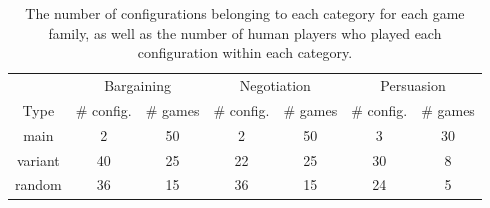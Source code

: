 \begin{table}[h]
    \centering
        \caption{The number of configurations belonging to each category for each game family, as well as the number of human players who played each configuration within each category.}

    \begin{tabular}{c|cc|cc|cc}
    \toprule
     & \multicolumn{2}{|c}{Bargaining} & \multicolumn{2}{|c}{Negotiation} & \multicolumn{2}{|c}{Persuasion} \\
     Type & \# config. & \# games & \# config. & \# games & \# config. & \# games \\
    \midrule
    main & 2 & 50 & 2 & 50 & 3 & 30 \\
    variant & 40 & 25 & 22 & 25 & 30 & 8 \\
    random & 36 & 15 & 36 & 15 & 24 & 5 \\
    \bottomrule
    \end{tabular}
    \label{tab:human_data_config}
\end{table}
